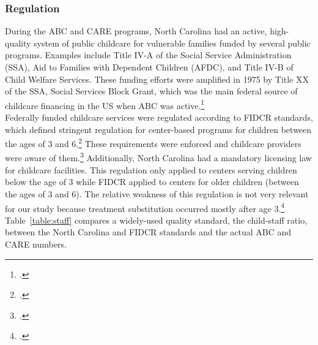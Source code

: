 \begin{appendices}
\subsubsection{Regulation}

\noindent During the ABC and CARE programs, North Carolina had an active, high-quality system of public childcare for vulnerable families funded by several public programs. Examples include Title IV-A of the Social Service Administration (SSA), Aid to Families with Dependent Children (AFDC), and Title IV-B of Child Welfare Services. These funding efforts were amplified in 1975 by Title XX of the SSA, Social Services Block Grant, which was the main federal source of childcare financing in the US when ABC was active.\footnote{\citet{Robins_1988_Federal-Child-Care}.}\\

\noindent Federally funded childcare services were regulated according to FIDCR standards, which defined stringent regulation for center-based programs for children between the ages of 3 and 6.\footnote{\citet{Department-of-Health_1968_DayCareRequirements}.} These requirements were enforced and childcare providers were aware of them.\footnote{\citet{Kuperman_2015_Clifford-Russell-Interview}.} Additionally, North Carolina had a mandatory licensing law for childcare facilities. This regulation only applied to centers serving children below the age of 3 while FIDCR applied to centers for older children (between the ages of 3 and 6). The relative weakness of this regulation is not very relevant for our study because treatment substitution occurred mostly after age 3.\footnote{\citet{NCGA_1971_House-Bill-100}.} Table~\ref{table:staff} compares a widely-used quality standard, the child-staff ratio, between the North Carolina and FIDCR standards and the actual ABC and CARE numbers.


\end{appendices}
